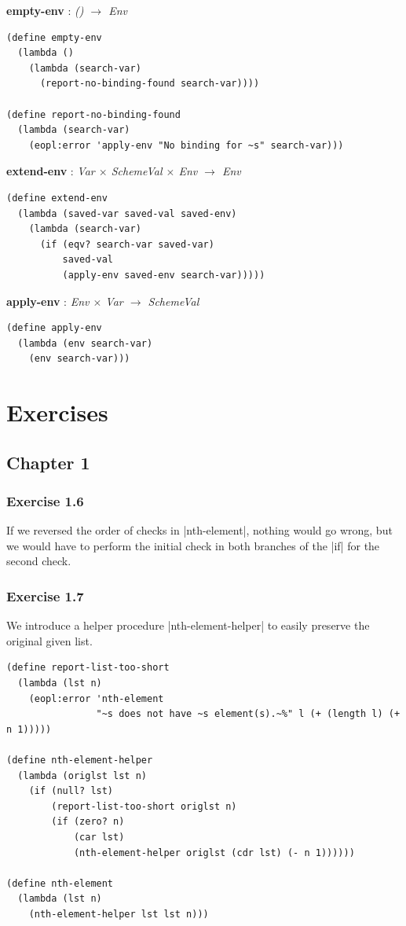 \documentclass[a4paper]{article}
\begin{document}
\textbf{empty-env} : \textit{() $\rightarrow$ Env}
\begin{lstlisting}[aboveskip=0pt]
(define empty-env
  (lambda ()
    (lambda (search-var)
      (report-no-binding-found search-var))))

(define report-no-binding-found
  (lambda (search-var)
    (eopl:error 'apply-env "No binding for ~s" search-var)))
\end{lstlisting}

\textbf{extend-env} : \textit{Var $\times$ SchemeVal $\times$ Env $\rightarrow$ Env}
\begin{lstlisting}[aboveskip=0pt]
(define extend-env
  (lambda (saved-var saved-val saved-env)
    (lambda (search-var)
      (if (eqv? search-var saved-var)
          saved-val
          (apply-env saved-env search-var)))))
\end{lstlisting}

\textbf{apply-env} : \textit{Env $\times$ Var $\rightarrow$ SchemeVal}
\begin{lstlisting}[aboveskip=0pt]
(define apply-env
  (lambda (env search-var)
    (env search-var)))
\end{lstlisting}

\newpage

\section{Exercises}

\subsection{Chapter 1}

\subsubsection{Exercise 1.6}

If we reversed the order of checks in |nth-element|, nothing would go wrong, but we would have to perform the initial check in both branches of the |if| for the second check.

\subsubsection{Exercise 1.7}

We introduce a helper procedure |nth-element-helper| to easily preserve the original given list.

\begin{lstlisting}
(define report-list-too-short
  (lambda (lst n)
    (eopl:error 'nth-element
                "~s does not have ~s element(s).~%" l (+ (length l) (+ n 1)))))

(define nth-element-helper
  (lambda (origlst lst n)
    (if (null? lst)
        (report-list-too-short origlst n)
        (if (zero? n)
            (car lst)
            (nth-element-helper origlst (cdr lst) (- n 1))))))

(define nth-element
  (lambda (lst n)
    (nth-element-helper lst lst n)))
\end{lstlisting}
\end{document}
